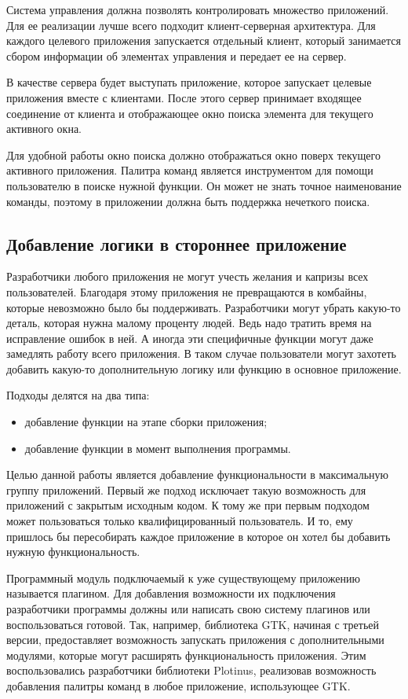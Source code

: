 Система управления должна позволять контролировать множество приложений. Для ее
реализации лучше всего подходит клиент-серверная архитектура. Для каждого
целевого приложения запускается отдельный клиент, который занимается сбором
информации об элементах управления и передает ее на сервер.

В качестве сервера будет выступать приложение, которое запускает целевые
приложения вместе с клиентами. После этого сервер принимает входящее соединение
от клиента и отображающее окно поиска элемента для текущего активного окна.

Для удобной работы окно поиска должно отображаться окно поверх текущего
активного приложения. Палитра команд является инструментом для помощи
пользователю в поиске нужной функции. Он может не знать точное наименование
команды, поэтому в приложении должна быть поддержка нечеткого поиска.

\subsection{Добавление логики в стороннее приложение}

Разработчики любого приложения не могут учесть желания и капризы всех
пользователей. Благодаря этому приложения не превращаются в комбайны, которые
невозможно было бы поддерживать. Разработчики могут убрать какую-то деталь,
которая нужна малому проценту людей. Ведь надо тратить время на исправление
ошибок в ней. А иногда эти специфичные функции могут даже замедлять работу всего
приложения. В таком случае пользователи могут захотеть добавить какую-то
дополнительную логику или функцию в основное приложение.

Подходы делятся на два типа:
\begin{itemize}
	\item добавление функции на этапе сборки приложения;
	\item добавление функции в момент выполнения программы.
\end{itemize}

Целью данной работы является добавление функциональности в максимальную группу
приложений. Первый же подход исключает такую возможность для приложений с
закрытым исходным кодом. К тому же при первым подходом может пользоваться только
квалифицированный пользователь. И то, ему пришлось бы пересобирать каждое
приложение в которое он хотел бы добавить нужную функциональность.

Программный модуль подключаемый к уже существующему приложению называется
плагином. Для добавления возможности их подключения разработчики программы
должны или написать свою систему плагинов или воспользоваться готовой. Так,
например, библиотека GTK, начиная с третьей версии, предоставляет возможность
запускать приложения с дополнительными модулями, которые могут расширять
функциональность приложения. Этим воспользовались разработчики библиотеки
Plotinus, реализовав возможность добавления палитры команд в любое приложение,
использующее GTK.

